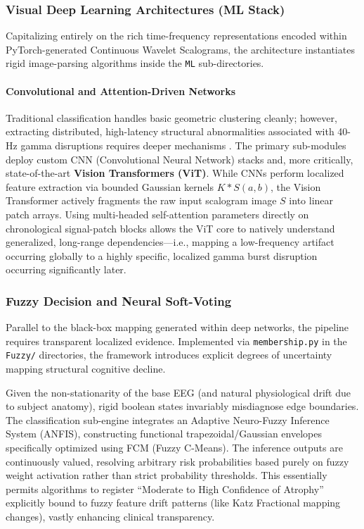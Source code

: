 \subsubsection{Visual Deep Learning Architectures (ML Stack)}
Capitalizing entirely on the rich time-frequency representations encoded within PyTorch-generated Continuous Wavelet Scalograms, the architecture instantiates rigid image-parsing algorithms inside the \texttt{ML} sub-directories.

\paragraph{Convolutional and Attention-Driven Networks}
Traditional classification handles basic geometric clustering cleanly; however, extracting distributed, high-latency structural abnormalities associated with 40-Hz gamma disruptions requires deeper mechanisms \cite{dosovitskiy2021vit}. The primary sub-modules deploy custom CNN (Convolutional Neural Network) stacks and, more critically, state-of-the-art \textbf{Vision Transformers (ViT)}. 
While CNNs perform localized feature extraction via bounded Gaussian kernels $K \ast S(a,b)$, the Vision Transformer actively fragments the raw input scalogram image $S$ into linear patch arrays. Using multi-headed self-attention parameters directly on chronological signal-patch blocks allows the ViT core to natively understand generalized, long-range dependencies—i.e., mapping a low-frequency artifact occurring globally to a highly specific, localized gamma burst disruption occurring significantly later.

\subsubsection{Fuzzy Decision and Neural Soft-Voting}
Parallel to the black-box mapping generated within deep networks, the pipeline requires transparent localized evidence. Implemented via \texttt{membership.py} in the \texttt{Fuzzy/} directories, the framework introduces explicit degrees of uncertainty mapping structural cognitive decline.

Given the non-stationarity of the base EEG (and natural physiological drift due to subject anatomy), rigid boolean states invariably misdiagnose edge boundaries. The classification sub-engine integrates an Adaptive Neuro-Fuzzy Inference System (ANFIS), constructing functional trapezoidal/Gaussian envelopes specifically optimized using FCM (Fuzzy C-Means). 
The inference outputs are continuously valued, resolving arbitrary risk probabilities based purely on fuzzy weight activation rather than strict probability thresholds. This essentially permits algorithms to register ``Moderate to High Confidence of Atrophy'' explicitly bound to fuzzy feature drift patterns (like Katz Fractional mapping changes), vastly enhancing clinical transparency. 

